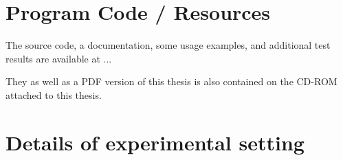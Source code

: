 \appendix



\chapter{Program Code / Resources}
\label{cha:appendix-a}

The source code, a documentation, some usage examples, and additional test results are available at ...

They as well as a PDF version of this thesis is also contained on the CD-ROM attached to this thesis.

\chapter{Details of experimental setting}
\label{cha:details of experimental setting}

